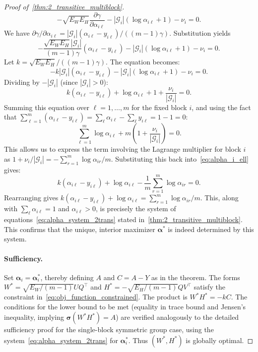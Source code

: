 \documentclass[11pt]{article}
\begin{document}
\begin{proof}[Proof of~\cref{thm:2_transitive_multiblock}]
\[ -\sqrt{E_W E_H} \frac{\partial \gamma}{\partial \alpha_{i\ell}} - |\mathcal G_i| (\log\alpha_{i\ell}+1) - \nu_i = 0. \]
We have \(\partial \gamma/\partial \alpha_{i\ell} = |\mathcal G_i|(\alpha_{i\ell}-y_{i\ell})/((m-1)\gamma)\). Substitution yields
\[ -\frac{\sqrt{E_W E_H} |\mathcal G_i|}{(m-1)\gamma} (\alpha_{i\ell}-y_{i\ell}) - |\mathcal G_i| (\log\alpha_{i\ell}+1) - \nu_i = 0. \]
Let \(k = \sqrt{E_W E_H}/((m-1)\gamma)\). The equation becomes:
\[ -k |\mathcal G_i| (\alpha_{i\ell}-y_{i\ell}) - |\mathcal G_i| (\log\alpha_{i\ell}+1) - \nu_i = 0. \]
Dividing by \(-|\mathcal G_i|\) (since \(|\mathcal G_i| > 0\)):
\begin{equation}
  \label{eq:alpha_i_ell}
  k (\alpha_{i\ell}-y_{i\ell}) + \log\alpha_{i\ell}+1 + \frac{\nu_i}{|\mathcal G_i|} = 0.
\end{equation}
Summing this equation over \(\ell=1,\dots,m\) for the fixed block \(i\), and using the fact that \(\sum_{\ell=1}^m (\alpha_{i\ell}-y_{i\ell}) = \sum_{\ell}\alpha_{i\ell} - \sum_{\ell}y_{i\ell} = 1-1=0\):
\[ \sum_{\ell=1}^m \log\alpha_{i\ell} + m\left(1 + \frac{\nu_i}{|\mathcal G_i|}\right) = 0. \]
This allows us to express the term involving the Lagrange multiplier for block \(i\) as \(1 + \nu_i/|\mathcal G_i| = -\sum_{r=1}^m \log\alpha_{ir}/m\).
Substituting this back into~\cref{eq:alpha_i_ell} gives:
\[ k (\alpha_{i\ell}-y_{i\ell}) + \log\alpha_{i\ell} - \frac{1}{m}\sum_{r=1}^m \log\alpha_{ir} = 0. \]
Rearranging gives \( k\left(\alpha_{i\ell}-y_{i\ell}\right) + \log\alpha_{i\ell} = \sum_{r=1}^{m}\log\alpha_{ir}/m \). This, along with \(\sum_{\ell}\alpha_{i\ell}=1\) and \(\alpha_{i\ell}>0\), is precisely the system of equations~\cref{eq:alpha_system_2trans} stated in~\cref{thm:2_transitive_multiblock}. This confirms that the unique, interior maximizer \(\boldsymbol{\alpha}^*\) is indeed determined by this system.

\paragraph{Sufficiency.}
Set \(\boldsymbol{\alpha}_i = \boldsymbol{\alpha}_i^*\), thereby defining \(A\) and \(C=A-Y\) as in the theorem. The forms \(W^*=\sqrt{E_W/(m-1)} UQ^{\top}\) and \(H^*=-\sqrt{E_H/(m-1)} QV^{\top}\) satisfy the constraint in~\cref{eq:obj_function_constrained}. The product is \(W^*H^* = -kC\). The conditions for the lower bound to be met (equality in trace bound and Jensen's inequality, implying \(\boldsymbol{\sigma}(W^*H^*)=A\)) are verified analogously to the detailed sufficiency proof for the single-block symmetric group case, using the system~\cref{eq:alpha_system_2trans} for \(\boldsymbol{\alpha}_i^*\). Thus \((W^*,H^*)\) is globally optimal.


\end{proof}
\end{document}
